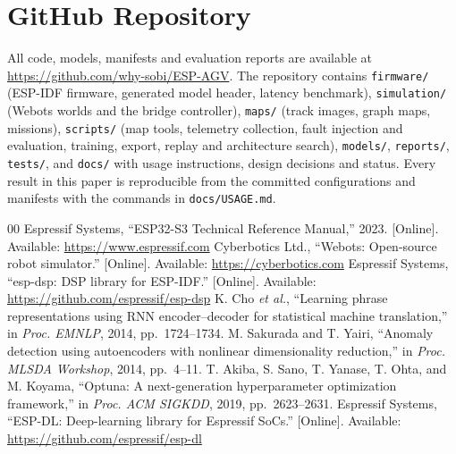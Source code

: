 \documentclass[conference]{IEEEtran}
\begin{document}
\section*{GitHub Repository}
All code, models, manifests and evaluation reports are available at
\url{https://github.com/why-sobi/ESP-AGV}. The repository contains
\texttt{firmware/} (ESP-IDF firmware, generated model header, latency benchmark),
\texttt{simulation/} (Webots worlds and the bridge controller),
\texttt{maps/} (track images, graph maps, missions),
\texttt{scripts/} (map tools, telemetry collection, fault injection and
evaluation, training, export, replay and architecture search),
\texttt{models/}, \texttt{reports/}, \texttt{tests/}, and \texttt{docs/} with
usage instructions, design decisions and status. Every result in this paper is
reproducible from the committed configurations and manifests with the commands
in \texttt{docs/USAGE.md}.

\begin{thebibliography}{00}
 Espressif Systems, ``ESP32-S3 Technical Reference Manual,'' 2023. [Online]. Available: \url{https://www.espressif.com}
 Cyberbotics Ltd., ``Webots: Open-source robot simulator.'' [Online]. Available: \url{https://cyberbotics.com}
 Espressif Systems, ``esp-dsp: DSP library for ESP-IDF.'' [Online]. Available: \url{https://github.com/espressif/esp-dsp}
 K. Cho \textit{et al.}, ``Learning phrase representations using RNN encoder--decoder for statistical machine translation,'' in \textit{Proc. EMNLP}, 2014, pp.~1724--1734.
 M. Sakurada and T. Yairi, ``Anomaly detection using autoencoders with nonlinear dimensionality reduction,'' in \textit{Proc. MLSDA Workshop}, 2014, pp.~4--11.
 T. Akiba, S. Sano, T. Yanase, T. Ohta, and M. Koyama, ``Optuna: A next-generation hyperparameter optimization framework,'' in \textit{Proc. ACM SIGKDD}, 2019, pp.~2623--2631.
 Espressif Systems, ``ESP-DL: Deep-learning library for Espressif SoCs.'' [Online]. Available: \url{https://github.com/espressif/esp-dl}
\end{thebibliography}
\end{document}
